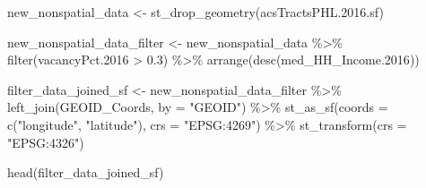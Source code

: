 \documentclass[
]{article}
\newenvironment{Shaded}{\begin{snugshade}}{\end{snugshade}}
\newcommand{\AttributeTok}[1]{\textcolor[rgb]{0.77,0.63,0.00}{#1}}
\newcommand{\FloatTok}[1]{\textcolor[rgb]{0.00,0.00,0.81}{#1}}
\newcommand{\FunctionTok}[1]{\textcolor[rgb]{0.00,0.00,0.00}{#1}}
\newcommand{\NormalTok}[1]{#1}
\newcommand{\OtherTok}[1]{\textcolor[rgb]{0.56,0.35,0.01}{#1}}
\newcommand{\SpecialCharTok}[1]{\textcolor[rgb]{0.00,0.00,0.00}{#1}}
\newcommand{\StringTok}[1]{\textcolor[rgb]{0.31,0.60,0.02}{#1}}
\begin{document}
\begin{Shaded}
\begin{Highlighting}[]
\NormalTok{new\_nonspatial\_data }\OtherTok{\textless{}{-}} \FunctionTok{st\_drop\_geometry}\NormalTok{(acsTractsPHL.}\FloatTok{2016.}\NormalTok{sf) }

\NormalTok{new\_nonspatial\_data\_filter }\OtherTok{\textless{}{-}}\NormalTok{ new\_nonspatial\_data }\SpecialCharTok{\%\textgreater{}\%} 
  \FunctionTok{filter}\NormalTok{(vacancyPct}\FloatTok{.2016} \SpecialCharTok{\textgreater{}} \FloatTok{0.3}\NormalTok{) }\SpecialCharTok{\%\textgreater{}\%} 
  \FunctionTok{arrange}\NormalTok{(}\FunctionTok{desc}\NormalTok{(med\_HH\_Income}\FloatTok{.2016}\NormalTok{))}

\NormalTok{filter\_data\_joined\_sf }\OtherTok{\textless{}{-}}\NormalTok{ new\_nonspatial\_data\_filter }\SpecialCharTok{\%\textgreater{}\%} 
  \FunctionTok{left\_join}\NormalTok{(GEOID\_Coords, }\AttributeTok{by =} \StringTok{"GEOID"}\NormalTok{) }\SpecialCharTok{\%\textgreater{}\%} 
  \FunctionTok{st\_as\_sf}\NormalTok{(}\AttributeTok{coords =} \FunctionTok{c}\NormalTok{(}\StringTok{"longitude"}\NormalTok{, }\StringTok{"latitude"}\NormalTok{),}
                      \AttributeTok{crs =} \StringTok{"EPSG:4269"}\NormalTok{) }\SpecialCharTok{\%\textgreater{}\%} 
  \FunctionTok{st\_transform}\NormalTok{(}\AttributeTok{crs =} \StringTok{"EPSG:4326"}\NormalTok{)}

\FunctionTok{head}\NormalTok{(filter\_data\_joined\_sf) }
\end{Highlighting}
\end{Shaded}
\end{document}

